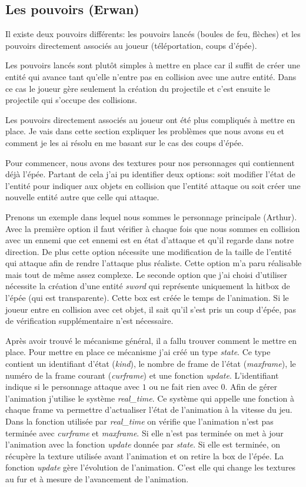 \documentclass{article}
\begin{document}
\subsection{Les pouvoirs (Erwan)}

Il existe deux pouvoirs différents: les pouvoirs lancés (boules de feu, flèches) et les pouvoirs 
directement associés au joueur (téléportation, coups d'épée).

Les pouvoirs lancés sont plutôt simples à mettre en place car il suffit de créer une 
entité qui avance tant qu'elle n'entre pas en collision avec une autre entité. Dans ce cas le joueur 
gère seulement la création du projectile et c'est ensuite le projectile qui s'occupe des collisions.

Les pouvoirs directement associés au joueur ont été plus compliqués à mettre en place. Je vais 
dans cette section expliquer les problèmes que nous avons eu et comment je les ai résolu en me basant 
sur le cas des coups d'épée.

Pour commencer, nous avons des textures pour nos personnages qui contiennent déjà l'épée. Partant de cela
j'ai pu identifier deux options: soit modifier l'état de l'entité pour indiquer aux objets en collision 
que l'entité attaque ou soit créer une nouvelle entité autre que celle qui attaque.

Prenons un exemple dans lequel nous sommes le personnage principale (Arthur). Avec la première option il 
faut vérifier à chaque fois que nous sommes en collision avec un ennemi que cet ennemi est en état d'attaque 
et qu'il regarde dans notre direction. De plus cette option nécessite une modification de la taille de 
l'entité qui attaque afin de rendre l'attaque plus réaliste. Cette option m'a paru réalisable mais tout de 
même assez complexe. Le seconde option que j'ai choisi d'utiliser nécessite la création d'une entité 
\textit{sword} qui représente uniquement la hitbox de l'épée (qui est transparente). Cette box est créée 
le temps de l'animation. Si le joueur entre en collision avec cet objet, il sait qu'il s'est pris un 
coup d'épée, pas de vérification supplémentaire n'est nécessaire.

Après avoir trouvé le mécanisme général, il a fallu trouver comment le mettre en place. Pour mettre en place 
ce mécanisme j'ai créé un type \textit{state}. Ce type contient un identifiant d'état (\textit{kind}), le 
nombre de frame de l'état (\textit{maxframe}), le numéro de la frame courant (\textit{curframe}) et une 
fonction \textit{update}. L'identifiant indique si le personnage attaque avec $1$ ou ne fait rien avec $0$. 
Afin de gérer l'animation j'utilise le système \textit{real\_time}. Ce système qui appelle une fonction à 
chaque frame va permettre d'actualiser l'état de l'animation à la vitesse du jeu. Dans la fonction utilisée 
par \textit{real\_time} on vérifie que l'animation 
n'est pas terminée avec \textit{curframe} et \textit{maxframe}. Si elle n'est pas terminée on met à jour 
l'animation avec la fonction \textit{update} donnée par \textit{state}. Si elle est terminée, on récupère la texture 
utilisée avant l'animation et on retire la box de l'épée.
La fonction \textit{update} gère l'évolution de l'animation. C'est elle qui change les textures au fur et à 
mesure de l'avancement de l'animation.
\end{document}

